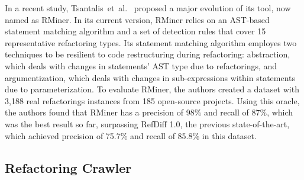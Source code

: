 In a recent study, Tsantalis~et~al.~\cite{tsantalis2018rminer} proposed a major evolution of its tool, now named as RMiner.
In its current version, RMiner relies on an AST-based statement matching algorithm and a set of detection rules that cover 15 representative refactoring types. 
Its statement matching algorithm employes two techniques to be resilient to code restructuring during refactoring: abstraction, which deals with changes in statements' AST type due to refactorings, and argumentization, which deals with changes in sub-expressions within statements due to parameterization.
To evaluate RMiner, the authors created a dataset with 3,188 real refactorings instances from 185 open-source projects. Using this oracle, the authors found that RMiner has a precision of 98\% and recall of 87\%, which was the best result so far, surpassing RefDiff 1.0, the previous state-of-the-art, which achieved precision of 75.7\% and recall of 85.8\% in this dataset.






\subsection{Refactoring Crawler}

